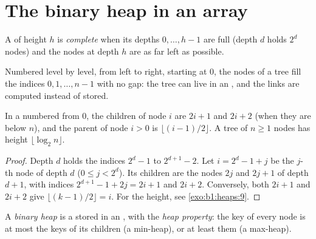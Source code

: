 \label{out:b1:heaps:naive}

\section{The binary heap in an array}\label{sec:b1:heaps:array}

\begin{definition}\label{def:b1:heaps:complete}
A  of height $h$ is \emph{complete} when its depths $0, \dots, h - 1$ are full
(depth $d$ holds $2^d$ nodes) and the nodes at depth $h$ are as far left as possible.
\end{definition}

Numbered level by level, from left to right, starting at 0, the nodes of a  tree fill the indices $0, 1,
\dots, n - 1$ with no gap: the tree can live in an , and the links are computed instead of stored.

\begin{proposition}\label{prop:b1:heaps:index}
In a  numbered from 0, the children of node $i$ are $2i + 1$ and $2i + 2$ (when they are below $n$),
and the parent of node $i > 0$ is $\lfloor (i - 1)/2 \rfloor$. A  tree of $n \geq 1$ nodes has height
$\lfloor \log_2 n \rfloor$.
\end{proposition}

\begin{proof}
Depth $d$ holds the indices $2^d - 1$ to $2^{d+1} - 2$. Let $i = 2^d - 1 + j$ be the $j$-th node of depth $d$ ($0 \leq j <
2^d$). Its children are the nodes $2j$ and $2j + 1$ of depth $d + 1$, with indices $2^{d+1} - 1 + 2j = 2i + 1$ and $2i +
2$. Conversely, both $2i + 1$ and $2i + 2$ give $\lfloor (k - 1)/2 \rfloor = i$. For the height, see
\cref{exo:b1:heaps:9}.
\end{proof}

\begin{definition}\label{def:b1:heaps:binary-heap}
A \emph{binary heap} is a  stored in an , with the \emph{heap
property}: the key of every node is at most the keys of its children (a min-heap), or at least
them (a max-heap).
\end{definition}

